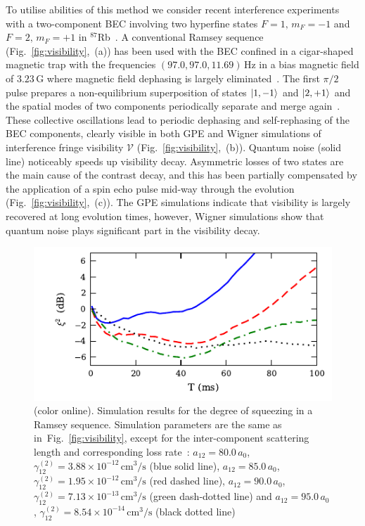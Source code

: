\documentclass[aps,prl,twocolumn,showpacs,amsmath,amssymb,superscriptaddress,flushbottom,noraggedfooter]{revtex4-1}
\newcommand{\Rb}{$^{87}$Rb}
\newcommand{\figref}[1]{Fig.~\ref{#1}}
\newcommand{\ket}[1]{\mbox{\ensuremath{\vert #1 \rangle}}}
\begin{document}
To utilise abilities of this method we consider recent interference experiments
with a two-component BEC involving two hyperfine states
${F=1,\, m_{F}=-1}$ and ${F=2,\, m_{F}=+1}$ in \Rb~\cite{Egorov2010}.
A conventional Ramsey sequence (\figref{fig:visibility},~(a)) has been used
with the BEC confined in a cigar-shaped magnetic trap with the frequencies $(97.0, 97.0, 11.69)\,\mathrm{Hz}$
in a bias magnetic field of $3.23\,\mathrm{G}$ where magnetic field dephasing is largely eliminated~\cite{Hall1998}.
The first $\pi/2$ pulse prepares a non-equilibrium superposition of states ${\ket{1,-1}}$ and ${\ket{2,+1}}$
and the spatial modes of two components periodically separate and merge again~\cite{Mertes2007}.
These collective oscillations lead to periodic dephasing and self-rephasing of the BEC components,
clearly visible in both GPE and Wigner simulations of interference fringe visibility
$\mathcal{V}$ (\figref{fig:visibility},~(b)).
Quantum noise (solid line) noticeably speeds up visibility decay.
Asymmetric losses of two states are the main cause of the contrast decay,
and this has been partially compensated by the application of a spin echo pulse
mid-way through the evolution (\figref{fig:visibility},~(c)).
The GPE simulations indicate that visibility is largely recovered at long evolution times,
however, Wigner simulations show that quantum noise plays significant part in the visibility decay.

\begin{figure}
	\includegraphics{figures_generated/ramsey_squeezing.pdf}

	\caption{(color online).
	Simulation results for the degree of squeezing in a Ramsey sequence.
	Simulation parameters are the same as in~\figref{fig:visibility},
	except for the inter-component scattering length and corresponding loss rate~\cite{Kaufman2009}:
	$a_{12} = 80.0\,a_0$, $\gamma^{(2)}_{12} = 3.88 \times 10^{-12}\,\mathrm{cm^3/s}$ (blue solid line),
	$a_{12} = 85.0\,a_0$, $\gamma^{(2)}_{12} = 1.95 \times 10^{-12}\,\mathrm{cm^3/s}$ (red dashed line),
	$a_{12} = 90.0\,a_0$, $\gamma^{(2)}_{12} = 7.13 \times 10^{-13}\,\mathrm{cm^3/s}$ (green dash-dotted line) and
	$a_{12} = 95.0\,a_0$, $\gamma^{(2)}_{12} = 8.54 \times 10^{-14}\,\mathrm{cm^3/s}$ (black dotted line)}

	\label{fig:squeezing}
\end{figure}
\end{document}
